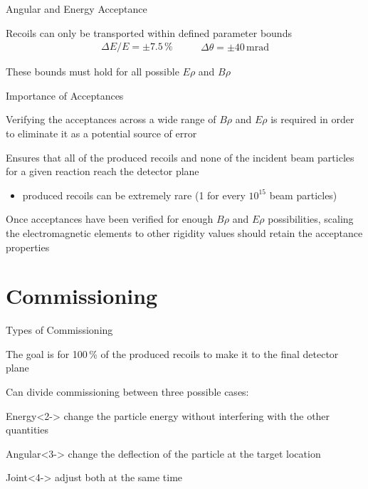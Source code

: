 \documentclass[10pt]{beamer}
\begin{document}
\begin{frame}[fragile]{Angular and Energy Acceptance}

    Recoils can only be transported within defined parameter bounds
    \[
        \begin{split}
            \Delta E/E = \pm7.5\,\%
        \end{split}
        \quad\quad
        \begin{split}
            \Delta\theta = \pm40\,\text{mrad}
        \end{split}
    \]

    These bounds must hold for all possible $E\rho$ and $B\rho$

\end{frame}

\begin{frame}[fragile]{Importance of Acceptances}

    Verifying the acceptances across a wide range of $B\rho$ and $E\rho$
    is required in order to eliminate it as a potential source of error

    Ensures that all of the produced recoils and none of the incident
    beam particles for a given reaction reach the detector plane
    \begin{itemize}
        \item produced recoils can be extremely rare (1 for every
            $10^{15}$ beam particles)
    \end{itemize}

    Once acceptances have been verified for enough $B\rho$ and $E\rho$
    possibilities, scaling the electromagnetic elements to other
    rigidity values should retain the acceptance properties

\end{frame}

\section{Commissioning}

\begin{frame}[fragile]{Types of Commissioning}

    The goal is for 100\,\% of the produced recoils to make it to the
    final detector plane

    Can divide commissioning between three possible cases:

    \begin{alertblock}{Energy}<2->%
        change the particle energy without interfering with the other
        quantities
    \end{alertblock}
    \begin{alertblock}{Angular}<3->
        change the deflection of the particle at the target location
    \end{alertblock}
    \begin{alertblock}{Joint}<4->
        adjust both at the same time
    \end{alertblock}

\end{frame}
\end{document}

